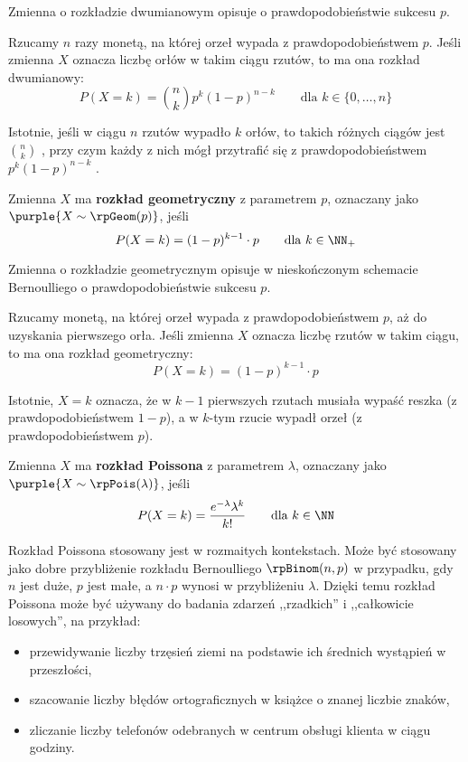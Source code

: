 Zmienna o rozkładzie dwumianowym opisuje  o prawdopodobieństwie sukcesu $p$.

\begin{example}
    Rzucamy $n$ razy monetą, na której orzeł wypada z prawdopodobieństwem $p$. Jeśli zmienna $X$ oznacza liczbę orłów w takim ciągu rzutów, to ma ona rozkład dwumianowy:
    $$P(X = k) = \binom{n}{k} p^k (1-p)^{n-k} \qquad \text{dla } k \in \{0,\ldots,n\}$$

    Istotnie, jeśli w ciągu $n$ rzutów wypadło $k$ orłów, to takich różnych ciągów jest $\binom{n}{k}$ , przy czym każdy z nich mógł przytrafić się z prawdopodobieństwem $p^k (1 - p)^{n - k}$ .
\end{example}

Zmienna $X$ ma \textbf{rozkład geometryczny} z parametrem $p$, oznaczany jako $\purple{X \sim \rpGeom(p)}$, jeśli
$$P(X = k) = (1-p)^{k-1} \cdot p \qquad \text{dla } k \in \NN_+$$

Zmienna o rozkładzie geometrycznym opisuje  w nieskończonym schemacie Bernoulliego o prawdopodobieństwie sukcesu $p$.

\begin{example}
    Rzucamy monetą, na której orzeł wypada z prawdopodobieństwem $p$, aż do uzyskania pierwszego orła. Jeśli zmienna $X$ oznacza liczbę rzutów w takim ciągu, to ma ona rozkład geometryczny: 
    $$P(X=k)=(1-p)^{k-1}\cdot p$$

    Istotnie, $X = k$ oznacza, że w $k - 1$ pierwszych rzutach musiała wypaść reszka (z prawdopodobieństwem $1 - p$), a w $k$-tym rzucie wypadł orzeł (z prawdopodobieństwem $p$).
\end{example}

Zmienna $X$ ma \textbf{rozkład Poissona} z parametrem $\lambda$, oznaczany jako $\purple{X \sim \rpPois(\lambda)}$, jeśli
$$P(X = k) = \frac{e^{-\lambda}\lambda^k}{k!} \qquad \text{dla } k \in \NN$$

Rozkład Poissona stosowany jest w rozmaitych kontekstach. Może być stosowany jako dobre przybliżenie rozkładu Bernoulliego $\rpBinom(n, p)$ w przypadku, gdy $n$ jest duże, $p$ jest małe, a $n \cdot p$ wynosi w przybliżeniu $\lambda$. Dzięki temu rozkład Poissona może być używany do badania zdarzeń ,,rzadkich'' i ,,całkowicie losowych'', na przykład:
\begin{itemize}
    \item przewidywanie liczby trzęsień ziemi na podstawie ich średnich wystąpień w przeszłości,
    \item szacowanie liczby błędów ortograficznych w książce o znanej liczbie znaków,
    \item zliczanie liczby telefonów odebranych w centrum obsługi klienta w ciągu godziny.
\end{itemize}

